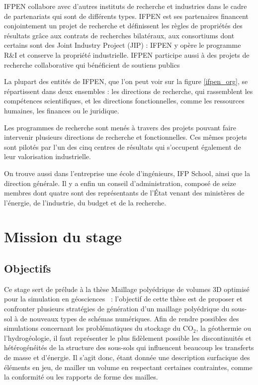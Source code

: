 \documentclass[12pt,a4paper,draft]{report}
\begin{document}
IFPEN collabore avec d'autres instituts de recherche et industries dans le cadre de partenariats qui sont de différents types. IFPEN est ses partenaires financent conjointement un projet de recherche et définissent les règles de propriétés des résultats grâce aux contrats de recherches bilatéraux, aux consortiums dont certains sont des Joint Industry Project (JIP) : IFPEN y opère le programme R\&I et conserve la propriété industrielle. IFPEN participe aussi à des projets de recherche collaborative qui bénéficient de soutiens publics

La plupart des entités de IFPEN, que l'on peut voir sur la figure \ref{ifpen_org}, se répartissent dans deux ensembles : les directions de recherche, qui rassemblent les compétences scientifiques, et les directions fonctionnelles, comme les ressources humaines, les finances ou le juridique.

Les programmes de recherche sont menés à travers des projets pouvant faire intervenir plusieurs directions de recherche et fonctionnelles. Ces mêmes projets sont pilotés par l'un des cinq centres de résultats qui s'occupent également de leur valorisation industrielle.

On trouve aussi dans l'entreprise une école d'ingénieurs, IFP School, ainsi que la direction générale. Il y a enfin un conseil d'administration, composé de seize membres dont quatre sont des représentants de l'\'Etat venant des ministères de l'énergie, de l'industrie, du budget et de la recherche.

\section{Mission du stage}

\subsection{Objectifs}

Ce stage sert de prélude à la thèse \og Maillage polyédrique de volumes 3D optimisé pour la simulation en géosciences \fg{}~: l'objectif de cette thèse est de proposer et confronter plusieurs stratégies de génération d'un maillage polyédrique du sous-sol à de nouveaux types de schémas numériques. Afin de rendre possibles des simulations concernant les problématiques du stockage du CO$_2$, la géothermie ou l'hydrogéologie, il faut représenter le plus fidèlement possible les discontinuités et hétérogénéités de la structure des sous-sols qui influencent beaucoup les transferts de masse et d'énergie. Il s'agit donc, étant donnée une description surfacique des éléments en jeu, de mailler un volume en respectant certaines contraintes, comme la conformité ou les rapports de forme des mailles.
\end{document}
